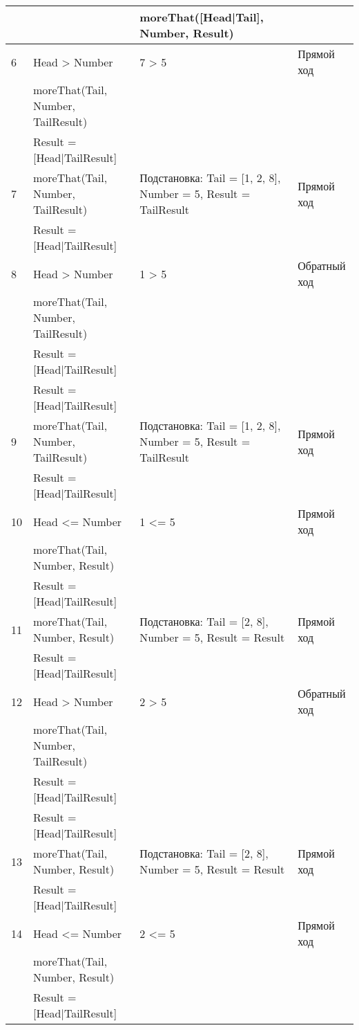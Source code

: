 {\begin{longtable}{|p{1.15cm}|p{6cm}|p{6cm}|p{4cm}|}
      & & moreThat([Head|Tail], Number, Result) & \\
    \hline
    6 & Head > Number & 7 > 5 & Прямой ход \\
      & moreThat(Tail, Number, TailResult) & & \\
      & Result = [Head|TailResult] & & \\
    \hline
    7 & moreThat(Tail, Number, TailResult) & Подстановка: Tail = [1, 2, 8], Number = 5, Result = TailResult & Прямой ход \\
      & Result = [Head|TailResult] & & \\
    \hline
    8 & Head > Number & 1 > 5 & Обратный ход \\
      & moreThat(Tail, Number, TailResult) & & \\
      & Result = [Head|TailResult] & & \\
      & Result = [Head|TailResult] & & \\
    \hline
    9 & moreThat(Tail, Number, TailResult) & Подстановка: Tail = [1, 2, 8], Number = 5, Result = TailResult & Прямой ход \\
      & Result = [Head|TailResult] & & \\
    \hline
    10 & Head <= Number & 1 <= 5 & Прямой ход \\
       & moreThat(Tail, Number, Result) & & \\
       & Result = [Head|TailResult] & & \\
    \hline
    11 & moreThat(Tail, Number, Result) & Подстановка: Tail = [2, 8], Number = 5, Result = Result & Прямой ход \\
       & Result = [Head|TailResult] & & \\
    \hline
    12 & Head > Number & 2 > 5 & Обратный ход \\
       & moreThat(Tail, Number, TailResult) & & \\
       & Result = [Head|TailResult] & & \\
       & Result = [Head|TailResult] & & \\
    \hline
    13 & moreThat(Tail, Number, Result) & Подстановка: Tail = [2, 8], Number = 5, Result = Result & Прямой ход \\
       & Result = [Head|TailResult] & & \\
    \hline
    14 & Head <= Number & 2 <= 5 & Прямой ход \\
       & moreThat(Tail, Number, Result) & & \\
       & Result = [Head|TailResult] & & \\

\end{longtable}}
